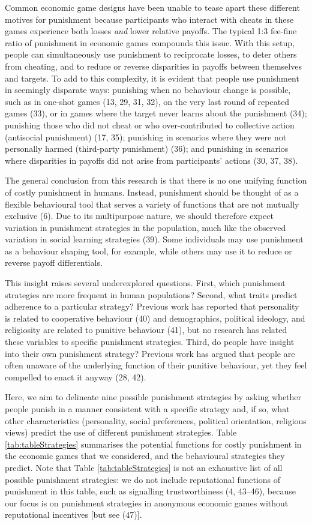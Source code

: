 \documentclass[
  man, donotrepeattitle,floatsintext]{apa6}
\begin{document}
Common economic game designs have been unable to tease apart these different
motives for punishment because participants who interact with cheats in these
games experience both losses \emph{and} lower relative payoffs. The typical 1:3
fee-fine ratio of punishment in economic games compounds this issue. With
this setup, people can simultaneously use punishment to reciprocate losses, to
deter others from cheating, and to reduce or reverse disparities in payoffs
between themselves and targets. To add to this complexity, it is evident that
people use punishment in seemingly disparate ways: punishing when no behaviour
change is possible, such as in one-shot games (13, 29, 31, 32), on the very last round of repeated games
(33), or in games where the target never learns about the
punishment (34); punishing those who did not cheat or who
over-contributed to collective action (antisocial punishment)
(17, 35); punishing in scenarios where they were not
personally harmed (third-party punishment) (36); and punishing in
scenarios where disparities in payoffs did not arise from participants'
actions (30, 37, 38).

The general conclusion from this research is that there is no one unifying
function of costly punishment in humans. Instead, punishment should be thought
of as a flexible behavioural tool that serves a variety of functions that are
not mutually exclusive (6). Due to its multipurpose nature, we should
therefore expect variation in punishment strategies in the population, much like
the observed variation in social learning strategies (39). Some
individuals may use punishment as a behaviour shaping tool, for example, while
others may use it to reduce or reverse payoff differentials.

This insight raises several underexplored questions. First, which punishment
strategies are more frequent in human populations? Second, what traits predict
adherence to a particular strategy? Previous work has reported that personality
is related to cooperative behaviour (40) and demographics, political
ideology, and religiosity are related to punitive behaviour (41), but
no research has related these variables to specific punishment strategies.
Third, do people have insight into their own punishment strategy? Previous work
has argued that people are often unaware of the underlying function of their
punitive behaviour, yet they feel compelled to enact it anyway
(28, 42).

Here, we aim to delineate nine possible punishment strategies by asking
whether people punish in a manner consistent with a specific strategy and, if
so, what other characteristics (personality, social preferences, political
orientation, religious views) predict the use of different punishment strategies.
Table \ref{tab:tableStrategies} summarises the potential functions for costly
punishment in the economic games that we considered, and the behavioural
strategies they predict. Note that Table \ref{tab:tableStrategies} is not
an exhaustive list of all possible punishment strategies: we do not include
reputational functions of punishment in this table, such as signalling
trustworthiness (4, 43--46),
because our focus is on punishment strategies in anonymous economic games without
reputational incentives {[}but see (47){]}.
\end{document}
